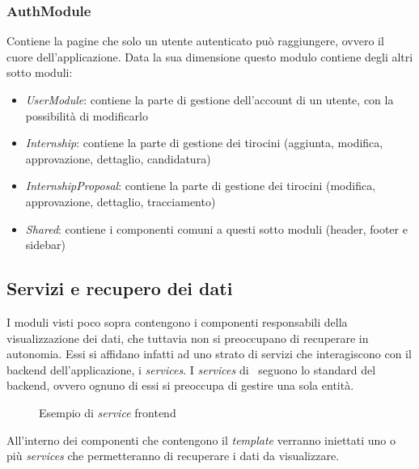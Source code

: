 \subsubsection{AuthModule}
\label{client:auth-module}
Contiene la pagine che solo un utente autenticato può raggiungere, ovvero il cuore dell'applicazione. Data la sua dimensione questo modulo contiene degli altri sotto moduli:
\begin{itemize}
	\item \textit{UserModule}: contiene la parte di gestione dell'account di un utente, con la possibilità di modificarlo
	\item \textit{Internship}: contiene la parte di gestione dei tirocini (aggiunta, modifica, approvazione, dettaglio, candidatura)
	\item \textit{InternshipProposal}: contiene la parte di gestione dei tirocini (modifica, approvazione, dettaglio, tracciamento)
	\item \textit{Shared}: contiene i componenti comuni a questi sotto moduli (header, footer e sidebar)
\end{itemize}


\subsection{Servizi e recupero dei dati}
\label{client:services}
I moduli visti poco sopra contengono i componenti responsabili della visualizzazione dei dati, che tuttavia non si preoccupano di recuperare in autonomia. Essi si affidano infatti ad uno strato di servizi che interagiscono con il \gls{backend} dell'applicazione, i \textit{services}.
I \textit{services} di \angular~seguono lo standard del \gls{backend}, ovvero ognuno di essi si preoccupa di gestire una sola entità.
 \begin{figure}[!h] 
 	\centering    
 	
 	\caption[Esempio di \textit{service} \gls{frontend}]{Esempio di \textit{service} \gls{frontend}}
 	\label{fig:client-service}
 \end{figure}
All'interno dei componenti che contengono il \textit{template} verranno iniettati uno o più \textit{services} che permetteranno di recuperare i dati da visualizzare.

